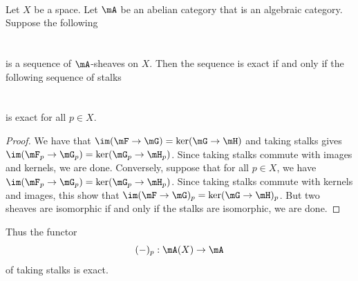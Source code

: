 \documentclass[a4paper]{article}
\begin{document}
\begin{prp}{}{}\\
Let $X$ be a space. Let $\mA$ be an abelian category that is an algebraic category. Suppose the following \\
 \\~\\
is a sequence of $\mA$-sheaves on $X$. Then the sequence is exact if and only if the following sequence of stalks\\
 \\~\\
is exact for all $p\in X$. 
\begin{proof}
We have that $\im(\mF\to\mG)=\ker(\mG\to\mH)$ and taking stalks gives $\im(\mF_p\to\mG_p)=\ker(\mG_p\to\mH_p)$. Since taking stalks commute with images and kernels, we are done. Conversely, suppose that for all $p\in X$, we have $\im(\mF_p\to\mG_p)=\ker(\mG_p\to\mH_p)$. Since taking stalks commute with kernels and images, this show that $\im(\mF\to\mG)_p=\ker(\mG\to\mH)_p$. But two sheaves are isomorphic if and only if the stalks are isomorphic, we are done. 
\end{proof}
\end{prp}

Thus the functor $$(-)_p:\mA(X)\to\mA$$ of taking stalks is exact. 
\end{document}
